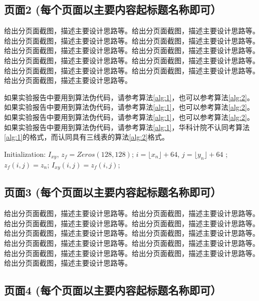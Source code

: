 \documentclass[supercite]{Experimental_Report}
\theoremstyle{definition}
\begin{document}
	\subsection{页面2 (每个页面以主要内容起标题名称即可）}
	
	给出分页面截图，描述主要设计思路等。给出分页面截图，描述主要设计思路等。给出分页面截图，描述主要设计思路等。给出分页面截图，描述主要设计思路等。给出分页面截图，描述主要设计思路等。给出分页面截图，描述主要设计思路等。给出分页面截图，描述主要设计思路等。给出分页面截图，描述主要设计思路等。给出分页面截图，描述主要设计思路等。给出分页面截图，描述主要设计思路等。给出分页面截图，描述主要设计思路等。
	
	
	如果实验报告中要用到算法伪代码，请参考算法\ref{alg:1}，也可以参考算法\ref{alg:2}。如果实验报告中要用到算法伪代码，请参考算法\ref{alg:1}，也可以参考算法\ref{alg:2}。如果实验报告中要用到算法伪代码，请参考算法\ref{alg:1}，也可以参考算法\ref{alg:2}。如果实验报告中要用到算法伪代码，请参考算法\ref{alg:1}，华科计院不认同考算法\ref{alg:1}的格式，而认同具有三线表的算法\ref{alg:2}格式。
	
	\begin{algorithm}[h] 
		\caption{一个更复杂算法}
		\begin{algorithmic}[1]
			\State Initialization: $I_{xy}$, $z_{f}=Zeros(128, 128)$; 
			\State $i=\lfloor x_n \rfloor+64$, $j=\lfloor y_n \rfloor + 64$
			;
			\State $z_{f}(i,j)=z_n$;
			\EndIf
			\State $I_{xy}(i,j)=z_{f}(i,j)$;
			\EndFor 
		\end{algorithmic}\label{alg:2}
	\end{algorithm}
	
	\subsection{页面3 (每个页面以主要内容起标题名称即可）}
	
	给出分页面截图，描述主要设计思路等。给出分页面截图，描述主要设计思路等。给出分页面截图，描述主要设计思路等。给出分页面截图，描述主要设计思路等。给出分页面截图，描述主要设计思路等。给出分页面截图，描述主要设计思路等。给出分页面截图，描述主要设计思路等。给出分页面截图，描述主要设计思路等。给出分页面截图，描述主要设计思路等。给出分页面截图，描述主要设计思路等。给出分页面截图，描述主要设计思路等。
	
	\subsection{页面4 (每个页面以主要内容起标题名称即可）}
	
\end{document}

